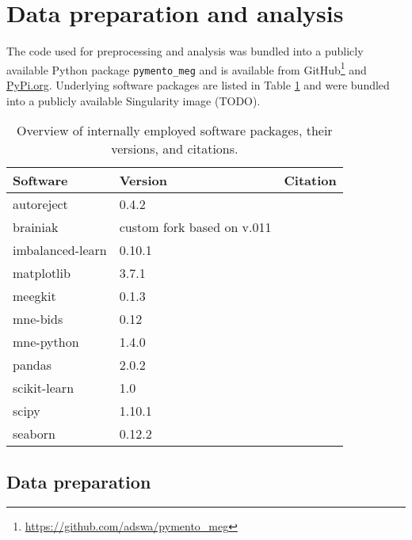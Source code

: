 \section{Data preparation and analysis}

The code used for preprocessing and analysis was bundled into a publicly available Python package \texttt{pymento\_meg} and is available from GitHub\footnote{\url{https://github.com/adswa/pymento_meg}} and \url{PyPi.org}.
Underlying software packages are listed in Table \ref{tab:software} and were bundled into a publicly available Singularity image (TODO).
\begin{center}
\begin{table}
	\begin{tabular}{ l l l }
		\hline
		Software	& Version 	& Citation \\ \hline
		autoreject 	& 0.4.2 	& \citet{jas2017autoreject} \\
		brainiak 	& custom fork based on v.011 & \citet{brainiak} \\
		imbalanced-learn & 0.10.1 & \citet{JMLR:v18:16-365} \\
		matplotlib 	& 3.7.1 	& \citet{Hunter2007} \\
		meegkit 	& 0.1.3 	& \citet{barascud2022} \\
		mne-bids 	& 0.12 		&  \citet{Appelhoff2019} \\
		mne-python 	& 1.4.0		& \citet{Gramfort_MEG_and_EEG_2013} \\
		pandas 		& 2.0.2 	& \citet{The_pandas_development_team_pandas-dev_pandas_Pandas} \\
		scikit-learn & 1.0	 	& \citet{scikit-learn} \\
		scipy 		& 1.10.1 	& \citet{2020SciPy-NMeth} \\
		seaborn 	& 0.12.2 	& \citet{Waskom2021}
	\end{tabular}
	\caption[Overview of software packages]{Overview of internally employed software packages, their versions, and citations.}
	\label{tab:software}
\end{table}
\end{center}

\subsection{Data preparation}

